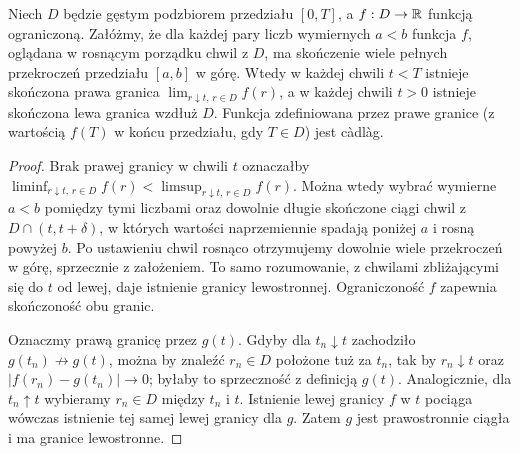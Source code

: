 \begin{lemat}
Niech $D$ będzie gęstym podzbiorem przedziału $[0,T]$,
a $f:D\to\mathbb{R}$ funkcją ograniczoną. Załóżmy, że dla każdej
pary liczb wymiernych $a<b$ funkcja $f$, oglądana w
rosnącym porządku chwil z $D$, ma skończenie wiele pełnych
przekroczeń przedziału $[a,b]$ w górę. Wtedy w każdej chwili
$t<T$ istnieje skończona prawa granica
$\lim_{r\downarrow t,\,r\in D}f(r)$, a w każdej chwili
$t>0$ istnieje skończona lewa granica wzdłuż $D$.
Funkcja zdefiniowana przez prawe granice (z wartością $f(T)$
w końcu przedziału, gdy $T\in D$) jest c\`adl\`ag.
\end{lemat}
\begin{proof}
Brak prawej granicy w chwili $t$ oznaczałby
$\liminf_{r\downarrow t,\,r\in D}f(r)
<\limsup_{r\downarrow t,\,r\in D}f(r)$.
Można wtedy wybrać wymierne $a<b$ pomiędzy tymi
liczbami oraz dowolnie długie skończone ciągi chwil
z $D\cap(t,t+\delta)$, w których wartości naprzemiennie
spadają poniżej $a$ i rosną powyżej $b$.
Po ustawieniu chwil rosnąco otrzymujemy dowolnie wiele
przekroczeń w górę, sprzecznie z założeniem.
To samo rozumowanie, z chwilami zbliżającymi się do $t$
od lewej, daje istnienie granicy lewostronnej.
Ograniczoność $f$ zapewnia skończoność obu granic.

Oznaczmy prawą granicę przez $g(t)$. Gdyby dla
$t_n\downarrow t$ zachodziło $g(t_n)\not\to g(t)$,
można by znaleźć $r_n\in D$ położone tuż za $t_n$,
tak by $r_n\downarrow t$ oraz
$|f(r_n)-g(t_n)|\to0$; byłaby to sprzeczność z
definicją $g(t)$. Analogicznie, dla $t_n\uparrow t$
wybieramy $r_n\in D$ między $t_n$ i $t$.
Istnienie lewej granicy $f$ w $t$ pociąga wówczas
istnienie tej samej lewej granicy dla $g$.
Zatem $g$ jest prawostronnie ciągła i ma granice
lewostronne.
\end{proof}

